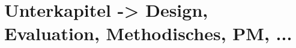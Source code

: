\section{Unterkapitel -> Design, Evaluation, Methodisches, PM, ...}
\label{sec:implementationA}





